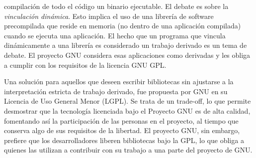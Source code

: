 	compilación de todo el código un binario ejecutable. El debate es sobre la \textit{vinculación dinámica}. Esto implica el uso de una librería de
	software precompilada que reside en memoria (no dentro de una aplicación compilada) cuando se ejecuta una aplicación. El hecho que un programa que 
	vincula dinámicamente a una librería es considerado un trabajo derivado es un tema de debate. El proyecto GNU considera esas aplicaciones como
	derivadas y les obliga a cumplir con los requisitos de la licencia GNU GPL.
	\vspace{0.5cm}
	\par	
 	Una solución para aquellos que deseen escribir bibliotecas sin ajustarse a la interpretación estricta de trabajo derivado, fue
 	propuesta por GNU en su Licencia de Uso General Menor (LGPL). Se trata de un trade-off, lo que permite desmostrar que la tecnología licenciada bajo
 	el Proyecto GNU es de alta calidad, fomentando así la participación de las personas en el proyecto, al tiempo que conserva algo de sus requisitos
 	de la libertad. El proyecto GNU, sin embargo, prefiere que los desarrolladores liberen bibliotecas bajo la GPL, lo que obliga a quienes las
 	utilizan a contribuir con su trabajo a una parte del proyecto de GNU.
	
	
	
